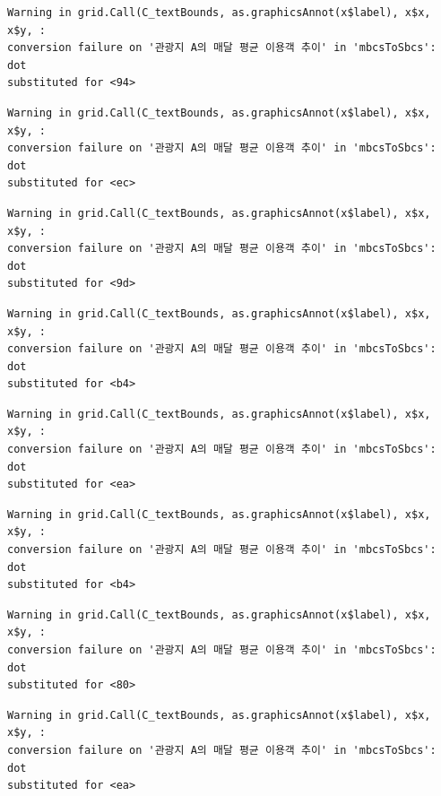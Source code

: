 \documentclass[
  letterpaper,
  DIV=11,
  numbers=noendperiod]{scrreprt}
\begin{document}
\begin{verbatim}
Warning in grid.Call(C_textBounds, as.graphicsAnnot(x$label), x$x, x$y, :
conversion failure on '관광지 A의 매달 평균 이용객 추이' in 'mbcsToSbcs': dot
substituted for <94>
\end{verbatim}

\begin{verbatim}
Warning in grid.Call(C_textBounds, as.graphicsAnnot(x$label), x$x, x$y, :
conversion failure on '관광지 A의 매달 평균 이용객 추이' in 'mbcsToSbcs': dot
substituted for <ec>
\end{verbatim}

\begin{verbatim}
Warning in grid.Call(C_textBounds, as.graphicsAnnot(x$label), x$x, x$y, :
conversion failure on '관광지 A의 매달 평균 이용객 추이' in 'mbcsToSbcs': dot
substituted for <9d>
\end{verbatim}

\begin{verbatim}
Warning in grid.Call(C_textBounds, as.graphicsAnnot(x$label), x$x, x$y, :
conversion failure on '관광지 A의 매달 평균 이용객 추이' in 'mbcsToSbcs': dot
substituted for <b4>
\end{verbatim}

\begin{verbatim}
Warning in grid.Call(C_textBounds, as.graphicsAnnot(x$label), x$x, x$y, :
conversion failure on '관광지 A의 매달 평균 이용객 추이' in 'mbcsToSbcs': dot
substituted for <ea>
\end{verbatim}

\begin{verbatim}
Warning in grid.Call(C_textBounds, as.graphicsAnnot(x$label), x$x, x$y, :
conversion failure on '관광지 A의 매달 평균 이용객 추이' in 'mbcsToSbcs': dot
substituted for <b4>
\end{verbatim}

\begin{verbatim}
Warning in grid.Call(C_textBounds, as.graphicsAnnot(x$label), x$x, x$y, :
conversion failure on '관광지 A의 매달 평균 이용객 추이' in 'mbcsToSbcs': dot
substituted for <80>
\end{verbatim}

\begin{verbatim}
Warning in grid.Call(C_textBounds, as.graphicsAnnot(x$label), x$x, x$y, :
conversion failure on '관광지 A의 매달 평균 이용객 추이' in 'mbcsToSbcs': dot
substituted for <ea>
\end{verbatim}
\end{document}
